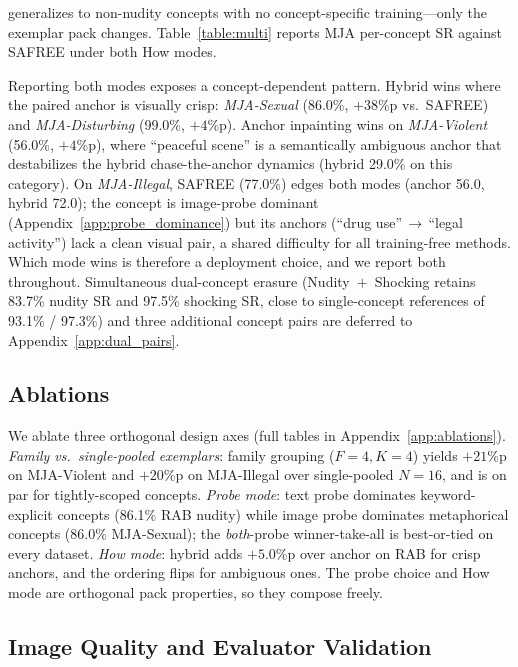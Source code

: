 \ours{} generalizes to non-nudity concepts with no concept-specific training---only the exemplar pack changes. Table~\ref{table:multi} reports MJA per-concept SR against SAFREE under both How modes.



Reporting both modes exposes a concept-dependent pattern. Hybrid wins where the paired anchor is visually crisp: \emph{MJA-Sexual} (86.0\%, $+38$\%p vs.\ SAFREE) and \emph{MJA-Disturbing} (99.0\%, $+4$\%p). Anchor inpainting wins on \emph{MJA-Violent} (56.0\%, $+4$\%p), where ``peaceful scene'' is a semantically ambiguous anchor that destabilizes the hybrid chase-the-anchor dynamics (hybrid 29.0\% on this category). On \emph{MJA-Illegal}, SAFREE (77.0\%) edges both modes (anchor 56.0, hybrid 72.0); the concept is image-probe dominant (Appendix~\ref{app:probe_dominance}) but its anchors (``drug use''\,$\to$\,``legal activity'') lack a clean visual pair, a shared difficulty for all training-free methods. Which mode wins is therefore a deployment choice, and we report both throughout. Simultaneous dual-concept erasure (Nudity~$+$~Shocking retains 83.7\% nudity SR and 97.5\% shocking SR, close to single-concept references of 93.1\% / 97.3\%) and three additional concept pairs are deferred to Appendix~\ref{app:dual_pairs}.

\subsection{Ablations}
\label{subsec:ablation}

We ablate three orthogonal design axes (full tables in Appendix~\ref{app:ablations}). \emph{Family vs.\ single-pooled exemplars}: family grouping ($F{=}4, K{=}4$) yields $+21$\%p on MJA-Violent and $+20$\%p on MJA-Illegal over single-pooled $N{=}16$, and is on par for tightly-scoped concepts. \emph{Probe mode}: text probe dominates keyword-explicit concepts (86.1\% RAB nudity) while image probe dominates metaphorical concepts (86.0\% MJA-Sexual); the \emph{both}-probe winner-take-all is best-or-tied on every dataset. \emph{How mode}: hybrid adds $+5.0$\%p over anchor on RAB for crisp anchors, and the ordering flips for ambiguous ones. The probe choice and How mode are orthogonal pack properties, so they compose freely.

\subsection{Image Quality and Evaluator Validation}
\label{subsec:quality}

